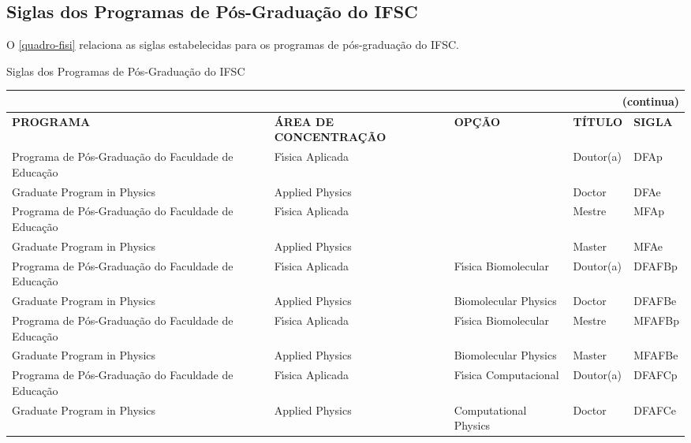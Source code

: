 \begin{apendicesenv}
\chapter{Siglas dos Programas de P\'os-Gradua\c{c}\~ao do IFSC}
O \autoref{quadro-fisi} relaciona as siglas estabelecidas para os programas de p\'os-gradua\c{c}\~ao do IFSC.
\begin{quadro}[Htb] 
	\ABNTEXfontereduzida
	\caption[Siglas dos Programas de P\'os-Gradua\c{c}\~ao do IFSC]{Siglas dos Programas de P\'os-Gradua\c{c}\~ao do IFSC}
	\label{quadro-fisi}
	\begin{tabular}{|p{3.5cm}|p{3.5cm}|p{3.5cm}|p{1.5cm}|p{2.25cm}|}
	\multicolumn{5}{r}{{(continua)}} \\ 
    \hline
		\textbf{PROGRAMA} & \textbf{\'AREA DE CONCENTRA\c{C}\~AO} & \textbf{OP\c{C}\~AO} & \textbf{T\'ITULO} & \textbf{SIGLA}  \\
		\hline
		Programa de P\'os-Gradua\c{c}\~ao do Faculdade de Educa\c{c}\~ao& F\'{\i}sica Aplicada &  & Doutor(a) & DFAp\\
		Graduate Program in Physics & Applied Physics &  & Doctor & DFAe\\
		Programa de P\'os-Gradua\c{c}\~ao do Faculdade de Educa\c{c}\~ao& F\'{\i}sica Aplicada &  & Mestre & MFAp\\
		Graduate Program in Physics & Applied Physics &  & Master & MFAe\\
		Programa de P\'os-Gradua\c{c}\~ao do Faculdade de Educa\c{c}\~ao& F\'{\i}sica Aplicada & F\'{\i}sica Biomolecular & Doutor(a) & DFAFBp\\
		Graduate Program in Physics & Applied Physics & Biomolecular Physics & Doctor & DFAFBe\\
		Programa de P\'os-Gradua\c{c}\~ao do Faculdade de Educa\c{c}\~ao& F\'{\i}sica Aplicada & F\'{\i}sica Biomolecular & Mestre & MFAFBp\\
		Graduate Program in Physics & Applied Physics & Biomolecular Physics & Master & MFAFBe\\
		Programa de P\'os-Gradua\c{c}\~ao do Faculdade de Educa\c{c}\~ao& F\'{\i}sica Aplicada & F\'{\i}sica Computacional & Doutor(a) & DFAFCp\\
		Graduate Program in Physics & Applied Physics & Computational Physics & Doctor & DFAFCe\\		

	\end{tabular}
\end{quadro}


\end{apendicesenv}
